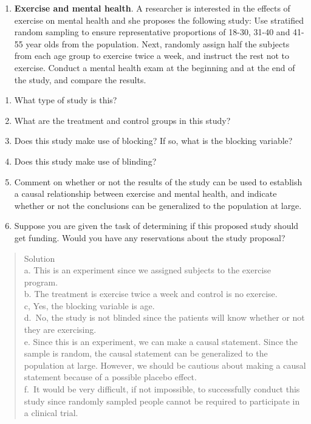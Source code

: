 \documentclass[
]{book}
\providecommand{\tightlist}{%
  \setlength{\itemsep}{0pt}\setlength{\parskip}{0pt}}
\begin{document}
\begin{enumerate}
\def\labelenumi{\arabic{enumi}.}
\setcounter{enumi}{4}
\tightlist
\item
  \textbf{Exercise and mental health}. A researcher is interested in the effects of exercise on mental health and she proposes the following study: Use stratified random sampling to ensure representative proportions of 18-30, 31-40 and 41-55 year olds from the population. Next, randomly assign half the subjects from each age group to exercise twice a week, and instruct the rest not to exercise. Conduct a mental health exam at the beginning and at the end of the study, and compare the results.
\end{enumerate}

\begin{enumerate}
\def\labelenumi{\alph{enumi}.}
\tightlist
\item
  What type of study is this?\\
\item
  What are the treatment and control groups in this study?\\
\item
  Does this study make use of blocking? If so, what is the blocking variable?\\
\item
  Does this study make use of blinding?\\
\item
  Comment on whether or not the results of the study can be used to establish a causal relationship between exercise and mental health, and indicate whether or not the conclusions can be generalized to the population at large.\\
\item
  Suppose you are given the task of determining if this proposed study should get funding. Would you have any reservations about the study proposal?
\end{enumerate}

\begin{quote}
Solution\\
a. This is an experiment since we assigned subjects to the exercise program.\\
b. The treatment is exercise twice a week and control is no exercise.\\
c, Yes, the blocking variable is age.\\
d.~No, the study is not blinded since the patients will know whether or not they are exercising.\\
e. Since this is an experiment, we can make a causal statement. Since the sample is random, the causal statement can be generalized to the population at large. However, we should be cautious about making a causal statement because of a possible placebo effect.\\
f.~It would be very difficult, if not impossible, to successfully conduct this study since randomly sampled people cannot be required to participate in a clinical trial.
\end{quote}
\end{document}
